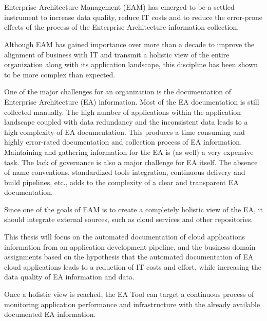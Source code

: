 \chapter{\abstractname}

Enterprise Architecture Management (EAM) has emerged to be a settled instrument to increase data quality, reduce IT costs and to reduce the error-prone effects of the process of the Enterprise Architecture information collection.

Although EAM has gained importance over more than a decade to improve the alignment of business with IT and transmit a holistic view of the entire organization along with its application landscape, this discipline has been shown to be more complex than expected.

One of the major challenges for an organization is the documentation of Enterprise Architecture (EA) information. Most of the EA documentation is still collected manually. The high number of applications within the application landscape coupled with data redundancy and the inconsistent data leads to a high complexity of EA documentation. This produces a time consuming and highly error-rated documentation and collection process of EA information. Maintaining and gathering information for the EA is (as well) a very expensive task.  The lack of governance is also a major challenge for EA itself. The absence of name conventions, standardized tools integration, continuous delivery and build pipelines, etc., adds to the complexity of a clear and transparent EA documentation.

Since one of the goals of EAM is to create a completely holistic view of the EA, it should integrate external sources, such as cloud services and other repositories.

This thesis will focus on the automated documentation of cloud applications information from an application development pipeline, and the business domain assignments based on the hypothesis that the automated documentation of EA cloud applications leads to a reduction of IT costs and effort, while increasing the data quality of EA information and data.

Once a holistic view is reached, the EA Tool can target a continuous process of monitoring application performance and infrastructure with the already available documented EA information.

